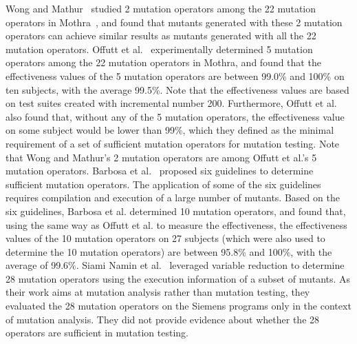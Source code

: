 Wong and Mathur~\cite{Wong:93,Wong:95} studied 2 mutation
operators among the 22 mutation operators in
Mothra~\cite{DeMillo:87}, and found that mutants generated with these
2 mutation operators can achieve similar results as mutants
generated with all the 22 mutation operators. Offutt et
al.~\cite{Offutt:96} experimentally determined 5 mutation
operators among the 22 mutation operators in Mothra, and found
that the effectiveness values of the 5 mutation operators are
between 99.0\% and 100\% on ten subjects, with the average 99.5\%.
Note that the effectiveness values are based on test suites
created with incremental number 200. Furthermore, Offutt et al.
also found that, without any of the 5 mutation operators, the
effectiveness value on some subject would be lower than 99\%,
which they defined as the minimal requirement of a set of
sufficient mutation operators for mutation testing. Note that Wong
and Mathur's 2 mutation operators are among Offutt et al.'s 5
mutation operators. Barbosa et al.~\cite{Barbosa:01} proposed six
guidelines to determine sufficient mutation operators. The
application of some of the six guidelines requires compilation and
execution of a large number of mutants. Based on the six
guidelines, Barbosa et al. determined 10 mutation operators, and
found that, using the same way as Offutt et al. to measure the
effectiveness, the effectiveness values of the 10 mutation
operators on 27 subjects (which were also used to determine the 10
mutation operators) are between 95.8\% and 100\%, with the average of
99.6\%. Siami Namin et al.~\cite{SiamiNamin:08} leveraged variable
reduction to determine 28 mutation operators using the execution
information of a subset of mutants. As their work aims at mutation
analysis rather than mutation testing, they evaluated the 28
mutation operators on the Siemens programs only in the context of
mutation analysis. They did not provide evidence about whether the
28 operators are sufficient in mutation testing.

